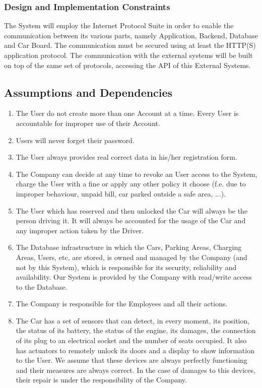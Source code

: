 \subsubsection{Design and Implementation Constraints}
The System will employ the Internet Protocol Suite in order to enable the communication between its various parts, namely Application, Backend, Database and Car Board. The communication must be secured using at least the HTTP(S) application protocol.
The communication with the external systems will be built on top of the same set of protocols, accessing the API of this External Systems.

\subsection{Assumptions and Dependencies}
\begin{enumerate}
	\item The User do not create more than one Account at a time. Every User is accountable for improper use of their Account.
	\item Users will never forget their password.
	\item The User always provides real correct data in his/her registration form. 	
	\item The Company can decide at any time to revoke an User access to the System, charge the User with a fine or apply any other policy it choose (f.e. due to improper behaviour, unpaid bill, car parked outside a safe area, ...).
	\item The User which has reserved and then unlocked the Car will always be the person driving it. It will always be accounted for the usage of the Car and any improper action taken by the Driver. 
	\item The Database infrastructure in which the Cars, Parking Areas, Charging Areas, Users, etc, are stored, is owned and managed by the Company (and not by this System), which is responsible for its security, reliability and availability. Our System is provided by the Company with read/write access to the Database.
	\item The Company is responsible for the Employees and all their actions.
	\item The Car has a set of sensors that can detect, in every moment, its position, the status of its battery, the status of the engine, its damages, the connection of its plug to an electrical socket and the number of seats occupied. It also has actuators to remotely unlock its doors and a display to show information to the User. We assume that these devices are always perfectly functioning and their measures are always correct. In the case of damages to this devices, their repair is under the responsibility of the Company.

\end{enumerate}
